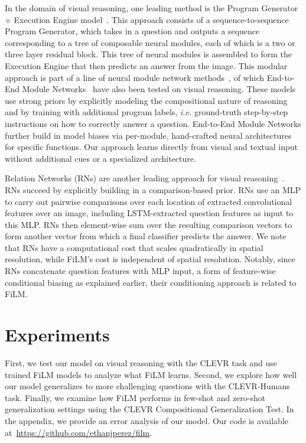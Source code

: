 \documentclass[letterpaper]{article} \usepackage{aaai18}  \usepackage{times}  \usepackage{helvet}  \usepackage{courier}  \usepackage{url}  \usepackage{graphicx}  \frenchspacing  \setlength{\pdfpagewidth}{8.5in}  \setlength{\pdfpageheight}{11in}
\begin{document}
	In the domain of visual reasoning, one leading method is the Program Generator + Execution Engine model~\cite{IEP}. This approach consists of a sequence-to-sequence Program Generator, which takes in a question and outputs a sequence corresponding to a tree of composable neural modules, each of which is a two or three layer residual block. This tree of neural modules is assembled to form the Execution Engine that then predicts an answer from the image. This modular approach is part of a line of neural module network methods~\cite{NMNQA,NMN,N2NMN}, of which End-to-End Module Networks~\cite{N2NMN} have also been tested on visual reasoning. These models use strong priors by explicitly modeling the compositional nature of reasoning and by training with additional program labels, \textit{i.e.} ground-truth step-by-step instructions on how to correctly answer a question. End-to-End Module Networks further build in model biases via per-module, hand-crafted neural architectures for specific functions. Our approach learns directly from visual and textual input without additional cues or a specialized architecture.

	Relation Networks (RNs) are another leading approach for visual reasoning~\cite{RN}. RNs succeed by explicitly building in a comparison-based prior. RNs use an MLP to carry out pairwise comparisons over each location of extracted convolutional features over an image, including LSTM-extracted question features as input to this MLP. RNs then element-wise sum over the resulting comparison vectors to form another vector from which a final classifier predicts the answer. We note that RNs have a computational cost that scales quadratically in spatial resolution, while FiLM's cost is independent of spatial resolution. Notably, since RNs concatenate question features with MLP input, a form of feature-wise conditional biasing as explained earlier, their conditioning approach is related to FiLM.

\section{Experiments} \label{experiments}

    First, we test our model on visual reasoning with the CLEVR task and use trained FiLM models to analyze what FiLM learns. Second, we explore how well our model generalizes to more challenging questions with the CLEVR-Humans task. Finally, we examine how FiLM performs in few-shot and zero-shot generalization settings using the CLEVR Compositional Generalization Test. In the appendix, we provide an error analysis of our model. Our code is available at~\url{https://github.com/ethanjperez/film}.
\end{document}
